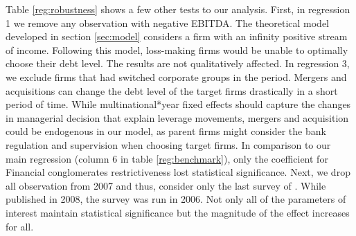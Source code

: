 \documentclass[12pt]{article}
\begin{document}
	Table \ref{reg:robustness} shows a few other tests to our analysis. First, in regression 1 we remove any observation with negative EBITDA. The theoretical model developed in section \ref{sec:model} considers a firm with an infinity positive stream of income. Following this model, loss-making firms would be unable to optimally choose their debt level. The results are not qualitatively affected. In regression 3, we exclude firms that had switched corporate groups in the period. Mergers and acquisitions can change the debt level of the target firms drastically in a short period of time. While multinational*year fixed effects should capture the changes in managerial decision that explain leverage movements, mergers and acquisition could be endogenous in our model, as parent firms might consider the bank regulation and supervision when choosing target firms. In comparison to our main regression (column 6 in table \ref{reg:benchmark}), only the coefficient for Financial conglomerates restrictiveness lost statistical significance. Next, we drop all observation from 2007 and thus, consider only the last survey of \cite{barth2013bank}. While published in 2008, the \cite{barth2008bank} survey was run in 2006. Not only all of the parameters of interest maintain statistical significance but the magnitude of the effect increases for all.
	
\end{document}
